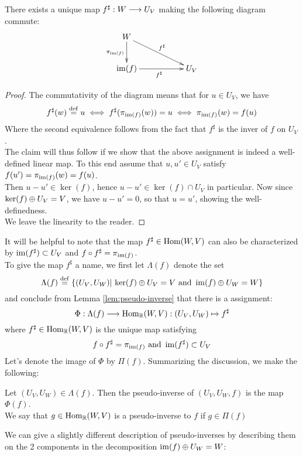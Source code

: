 \begin{lemma}\label{lem:pseudo-inverse}
	There exists a unique map $f^\sharp:W\longrightarrow U_V$ making the following diagram commute:
	\begin{displaymath}
	\xymatrix{
	W\ar[d]_{\pi_{\im(f)}}\ar[drr]^{f^\sharp}\\
	\im(f)\ar[rr]_{f^\sharp} && U_V
	}
	\end{displaymath}
\end{lemma}

\begin{proof}
The commutativity of the diagram means that for $u \in U_V$, we have
\[
	f^\sharp(w) \stackrel{\operatorname{def}}{=} u\iff f^\sharp(\pi_{\operatorname{im}(f)}(w)) =u\iff \pi_{\operatorname{im}(f)}(w) =f(u)
\]
Where the second equivalence follows from the fact that $f^\sharp$ is the inver of $f$ on $U_V$.\\
The claim will thus follow if we show that the above assignment is indeed a well-defined linear map. To this end assume that $u,u' \in U_V$ satisfy $f(u')=\pi_{\operatorname{im}(f)}(w)=f(u)$.\\ Then $u-u' \in \ker(f)$, hence $u-u' \in \ker(f)\cap U_V$ in particular. Now since $\ker(f)\oplus U_V =V$, we have  $u-u'=0$, so that $u=u'$, showing the well-definedness.\\ 
We leave the linearity to the reader.
\end{proof}
It will be helpful to note that the map $f^\sharp\in \operatorname{Hom}(W,V)$ can also be characterized by $\operatorname{im}(f^\sharp)\subset U_V$ and $f\circ f^\sharp =\pi_{\operatorname{im}(f)}$.\\
To give the map $f^\sharp$ a name, we first let $\Lambda(f)$ denote the set
\[
\Lambda(f)\stackrel{\operatorname{def}}{=} \{(U_V,U_W)\vert \, \ker(f)\oplus U_V=V \textrm{ and } \operatorname{im}(f)\oplus U_W =W \}
\]
and conclude from Lemma \ref{lem:pseudo-inverse} that there is a assignment:
\[
\Phi: \Lambda(f)\longrightarrow \operatorname{Hom}_{\mathbb{R}}(W,V):(U_V,U_W)\mapsto f^\sharp
\]
where $f^\sharp \in \operatorname{Hom}_{\mathbb{R}}(W,V)$ is the unique map satisfying
\[
f \circ f^\sharp = \pi_{\operatorname{im}(f)} \textrm{ and } \operatorname{im}(f^\sharp)\subset U_V
\]
Let's denote the image of $\Phi$ by $\Pi(f)$. Summarizing the discussion, we make the following:
\begin{definition}\label{def:ps}
Let $(U_V,U_W) \in \Lambda(f)$. Then the pseudo-inverse of $(U_V,U_W,f)$ is the map $\Phi(f)$.\\
We say that $g\in \operatorname{Hom}_{\mathbb{R}}(W,V)$ is a pseudo-inverse to $f$ if $g\in \Pi(f)$
\end{definition}

We can give a slightly different description of pseudo-inverses by describing them on the 2 components in the decomposition $\operatorname{im}(f)\oplus U_W =W$:


